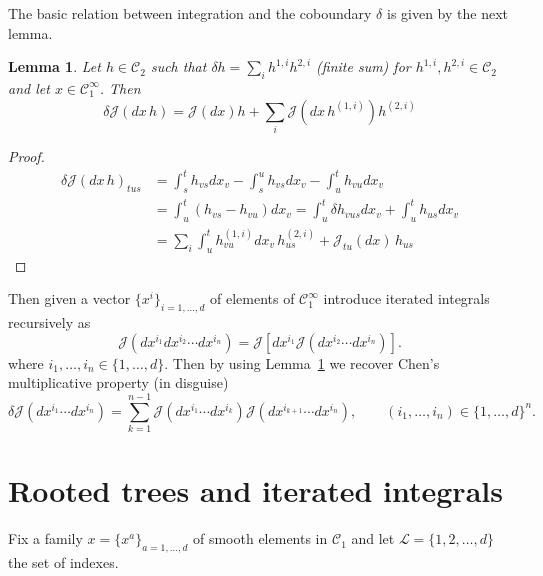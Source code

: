 \documentclass[a4paper,11pt,reqno]{article}
\newcommand{\1}{{\bf 1}}
\newcommand{\der}{\delta}
\newcommand{\CC}{\mathcal{C}}
\newcommand{\cj}{\mathcal J}
\newcommand{\cl}{\mathcal L}
\newtheorem{lemma}[theorem]{Lemma}
\begin{document}
The basic relation between integration and the coboundary $\der$ is given by the next lemma.

\begin{lemma}
\label{lemma:split}
Let $h \in \CC_2$ such that $\der h = \sum_i h^{1,i} h^{2,i}$ (finite sum) for $h^{1,i},h^{2,i} \in \CC_2$ and let $x \in \CC^\infty_1$. Then
\begin{equation}
  \label{eq:action-der}
\der \cj(dx\, h) = \cj(dx) h + \sum_i \cj(dx\, h^{(1,i)}) h^{(2,i)}  
\end{equation}
\end{lemma}
\begin{proof}
  \begin{equation*}
    \begin{split}
  \der \cj(dx\, h)_{tus} & = \int_s^t h_{vs} dx_v - \int_s^u h_{vs} dx_v - \int_{u}^t h_{vu}dx_v
\\ & = \int_u^t (h_{vs}-h_{vu}) dx_v
 = \int_u^t \der h _{vus} dx_v + \int_{u}^t h_{us} dx_v
\\ & = \sum_i \int_u^t h^{(1,i)}_{vu}   dx_v\, h^{(2,i)}_{us} + \cj_{tu}(dx)\, h_{us}
    \end{split}
  \end{equation*}
\end{proof}

Then given a vector $\{x^i \}_{i=1,\dots,d}$ of elements of $\CC_1^{\infty}$ introduce iterated integrals
 recursively as
$$
\cj(dx^{i_1} dx^{i_2}  \cdots dx^{i_n}) = \cj[dx^{i_1} \cj(dx^{i_2} \cdots dx^{i_n})].
$$ 
where $i_1,\dots,i_n \in \{1,\dots,d\}$.
Then by using Lemma~\ref{lemma:split} we recover Chen's multiplicative property (in disguise)
\begin{equation}
  \label{eq:chen}
\der \cj(dx^{i_1} \cdots dx^{i_n}) = \sum_{k=1}^{n-1} \cj(dx^{i_{1}} \cdots dx^{i_k}) \cj(dx^{i_{k+1}}\cdots dx^{i_n}), \qquad (i_1,\dots,i_n) \in \{1,\dots,d\}^n.
\end{equation}



\section{Rooted trees and iterated integrals}
\label{sec:itin}
Fix a family $x= \{x^a\}_{a=1,\dots,d}$ of smooth elements in $\CC_1$
and let $\cl =\{1,2,\dots,d\} $ the set of indexes. 
\end{document}
